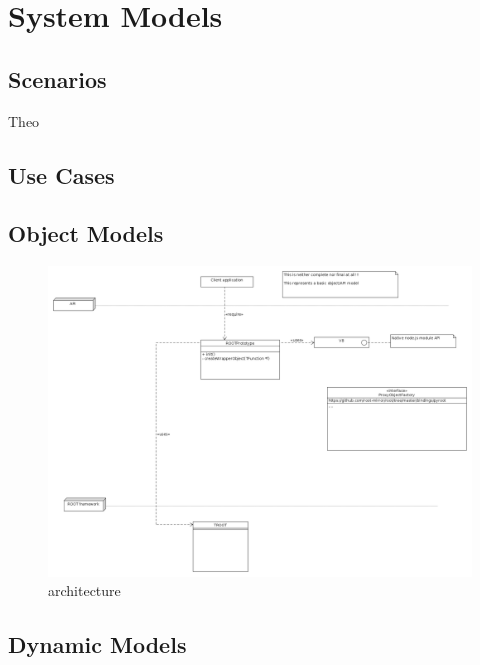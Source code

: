 \chapter{System Models}
\section{Scenarios}
Theo
\section{Use Cases}
\section{Object Models}

\begin{figure}[htb]
\centering
\includegraphics[bb=0 0 113 113]{./latex/resources/architecture.png}
\caption{architecture}
\end{figure}

\section{Dynamic Models}